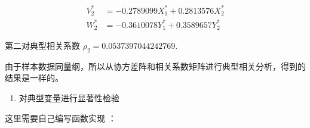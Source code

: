 \documentclass[11pt]{article}
\providecommand{\tightlist}{%
      \setlength{\itemsep}{0pt}\setlength{\parskip}{0pt}}
\begin{document}
\[
\begin{aligned}
V_2^* &= -0.2789099 X_1^* + 0.2813576 X_2^* \\
W_2^* &= -0.3610078 Y_1^* + 0.3589657 Y_2^*
\end{aligned}
\]

第二对典型相关系数 \(\rho_2 = 0.0537397044242769\).

由于样本数据同量纲，所以从协方差阵和相关系数矩阵进行典型相关分析，得到的结果是一样的。

    \begin{enumerate}
\def\labelenumi{\arabic{enumi}.}
\setcounter{enumi}{2}
\tightlist
\item
  对典型变量进行显著性检验
\end{enumerate}

    这里需要自己编写函数实现 \cite{ref1,ref3,ref4}：
\end{document}
